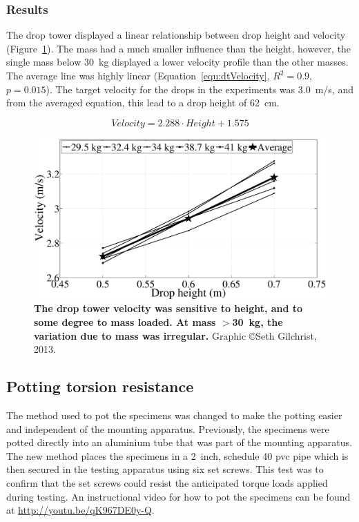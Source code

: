 \subsubsection{Results}

The drop tower displayed a linear relationship between drop height and velocity (Figure~\ref{fig:dtVelocity}).
The mass had a much smaller influence than the height, however, the single mass below 30~\ac{kg} displayed a lower velocity profile than the other masses.
The average line was highly linear (Equation~\ref{equ:dtVelocity}, $R^2 = 0.9$, $p = 0.015$).
The target velocity for the drops in the experiments was 3.0~\ac{m}/\ac{s}, and from the averaged equation, this lead to a drop height of 62~\ac{cm}.

\begin{equation}
\label{equ:dtVelocity}
Velocity = 2.288 \cdot Height + 1.575
\end{equation}

\begin{figure}
\centering
\includegraphics[width=\linewidth]{./appendixSupport/Figures/dtVelocity}
\caption[Drop tower calibration]{\textbf{The drop tower velocity was sensitive to height, and to some degree to mass loaded. At mass $>$30~\ac{kg}, the variation due to mass was irregular.} Graphic \copyright Seth Gilchrist, 2013.}
\label{fig:dtVelocity}
\end{figure}

\subsection{Potting torsion resistance}
\label{sec:equipment_potting}
The method used to pot the specimens was changed to make the potting easier and independent of the mounting apparatus.
Previously, the specimens were potted directly into an aluminium tube that was part of the mounting apparatus.
The new method places the specimens in a 2~inch, schedule 40 \ac{pvc} pipe which is then secured in the testing apparatus using six set screws.
This test was to confirm that the set screws could resist the anticipated torque loads applied during testing.
An instructional video for how to pot the specimens can be found at \url{http://youtu.be/qK967DE0y-Q}.

